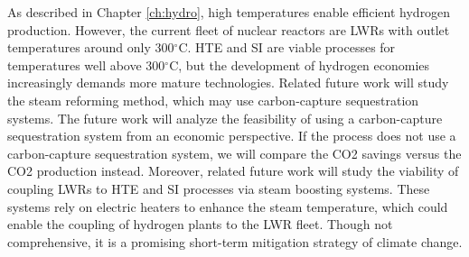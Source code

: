 As described in Chapter \ref{ch:hydro}, high temperatures enable efficient hydrogen production.
However, the current fleet of nuclear reactors are LWRs with outlet temperatures around only 300$^{\circ}$C.
HTE and SI are viable processes for temperatures well above 300$^{\circ}$C, but the development of hydrogen economies increasingly demands more mature technologies.
Related future work will study the steam reforming method, which may use carbon-capture sequestration systems.
The future work will analyze the feasibility of using a carbon-capture sequestration system from an economic perspective.
If the process does not use a carbon-capture sequestration system, we will compare the \gls{CO2} savings versus the \gls{CO2} production instead.
Moreover, related future work will study the viability of coupling LWRs to HTE and SI processes via steam boosting systems.
These systems rely on electric heaters to enhance the steam temperature, which could enable the coupling of hydrogen plants to the LWR fleet.
Though not comprehensive, it is a promising short-term mitigation strategy of climate change.
